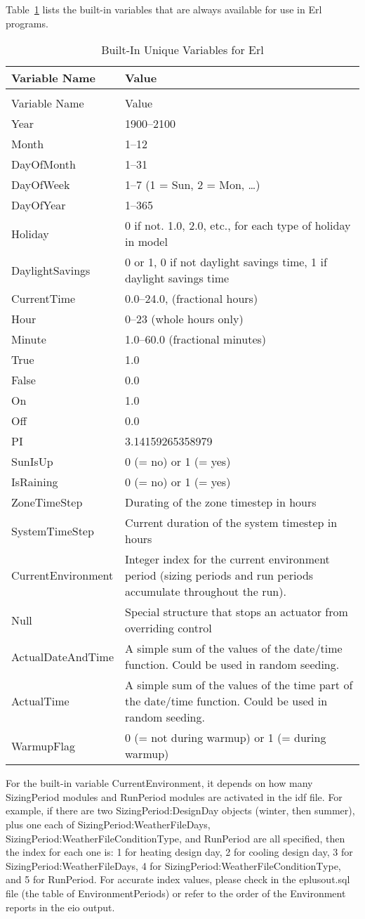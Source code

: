 Table~\ref{table:built-in-unique-variables-for-erl} lists the built-in variables that are always available for use in Erl programs.

\begin{longtable}[c]{p{1.5in}p{4.5in}}
\caption{Built-In Unique Variables for Erl \label{table:built-in-unique-variables-for-erl}} \tabularnewline
\toprule 
Variable Name & Value \tabularnewline
\midrule
\endfirsthead

\caption[]{Built-In Unique Variables for Erl} \tabularnewline
\toprule 
Variable Name & Value \tabularnewline
\midrule
\endhead

Year & 1900--2100 \tabularnewline
Month & 1--12 \tabularnewline
DayOfMonth & 1--31 \tabularnewline
DayOfWeek & 1--7 (1 = Sun, 2 = Mon, \ldots) \tabularnewline
DayOfYear & 1--365 \tabularnewline
Holiday & 0 if not. 1.0, 2.0, etc., for each type of holiday in model \tabularnewline
DaylightSavings & 0 or 1, 0 if not daylight savings time, 1 if daylight savings time \tabularnewline
CurrentTime & 0.0--24.0, (fractional hours) \tabularnewline
Hour & 0--23 (whole hours only) \tabularnewline
Minute & 1.0--60.0 (fractional minutes) \tabularnewline
True & 1.0 \tabularnewline
False & 0.0 \tabularnewline
On & 1.0 \tabularnewline
Off & 0.0 \tabularnewline
PI & 3.14159265358979 \tabularnewline
SunIsUp & 0 (= no) or 1 (= yes) \tabularnewline
IsRaining & 0 (= no) or 1 (= yes) \tabularnewline
ZoneTimeStep & Durating of the zone timestep in hours \tabularnewline
SystemTimeStep & Current duration of the system timestep in hours \tabularnewline
CurrentEnvironment & Integer index for the current environment period (sizing periods and run periods accumulate throughout the run). \tabularnewline
Null & Special structure that stops an actuator from overriding control \tabularnewline
ActualDateAndTime & A simple sum of the values of the date/time function. Could be used in random seeding. \tabularnewline
ActualTime & A simple sum of the values of the time part of the date/time function. Could be used in random seeding. \tabularnewline
WarmupFlag & 0 (= not during warmup) or 1 (= during warmup) \tabularnewline
\bottomrule
\end{longtable}

For the built-in variable CurrentEnvironment, it depends on how many SizingPeriod modules and RunPeriod modules are activated in the idf file. For example, if there are two SizingPeriod:DesignDay objects (winter, then summer), plus one each of SizingPeriod:WeatherFileDays, SizingPeriod:WeatherFileConditionType, and RunPeriod are all specified, then the index for each one is: 1 for heating design day, 2 for cooling design day, 3 for SizingPeriod:WeatherFileDays, 4 for SizingPeriod:WeatherFileConditionType, and 5 for RunPeriod. For accurate index values, please check in the eplusout.sql file (the table of EnvironmentPeriods) or refer to the order of the Environment reports in the eio output. 

